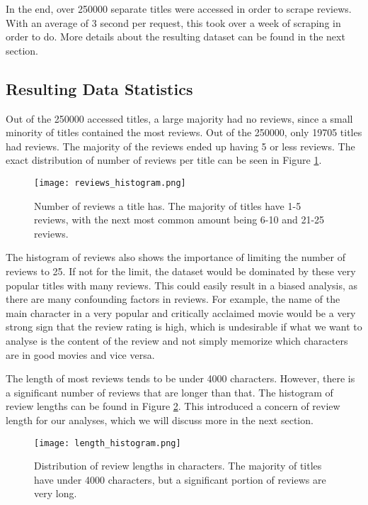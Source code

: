 \documentclass[12pt]{article}    %
\begin{document}
In the end, over 250000 separate titles were accessed in order to scrape reviews. With an average of 3 second per request, this took over a week of scraping in order to do. More details about the resulting dataset can be found in the next section. 

\subsection{Resulting Data Statistics}

Out of the 250000 accessed titles, a large majority had no reviews, since a small minority of titles contained the most reviews. Out of the 250000, only 19705 titles had reviews. The majority of the reviews ended up having 5 or less reviews. The exact distribution of number of reviews per title can be seen in Figure \ref{fig:review_hist}.

\begin{figure}
    \centering
    \texttt{[image: reviews\_histogram.png]}
    \caption{Number of reviews a title has. The majority of titles have 1-5 reviews, with the next most common amount being 6-10 and 21-25 reviews.}
    \label{fig:review_hist}
\end{figure}

The histogram of reviews also shows the importance of limiting the number of reviews to 25. If not for the limit, the dataset would be dominated by these very popular titles with many reviews. This could easily result in a biased analysis, as there are many confounding factors in reviews. For example, the name of the main character in a very popular and critically acclaimed movie would be a very strong sign that the review rating is high, which is undesirable if what we want to analyse is the content of the review and not simply memorize which characters are in good movies and vice versa.

The length of most reviews tends to be under 4000 characters. However, there is a significant number of reviews that are longer than that. The histogram of review lengths can be found in Figure \ref{fig:len_hist}. This introduced a concern of review length for our analyses, which we will discuss more in the next section.

\begin{figure}
    \centering
    \texttt{[image: length\_histogram.png]}
    \caption{Distribution of review lengths in characters. The majority of titles have under 4000 characters, but a significant portion of reviews are very long.}
    \label{fig:len_hist}
\end{figure}
\end{document}
